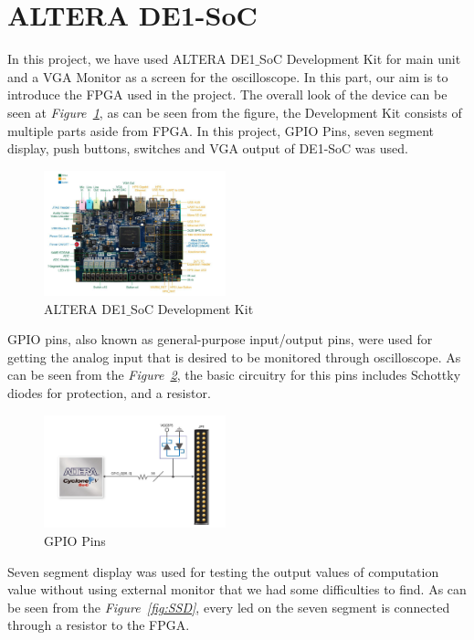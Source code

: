 \documentclass[paper]{IEEEtran}
\begin{document}
	
	\section{ALTERA DE1-SoC}
	\- \indent
	In this project, we have used ALTERA DE1$\_$SoC Development Kit for main unit and a VGA Monitor as a screen for the oscilloscope. In this part, our aim is to introduce the FPGA used in the project. The overall look of the device can be seen at \textit{Figure~\ref{fig:FPGA}}, as can be seen from the figure, the Development Kit consists of multiple parts aside from FPGA. In this project, GPIO Pins, seven segment display, push buttons, switches and VGA output of DE1-SoC was used.  
	
	\begin{figure}[H]
		\setlength{\unitlength}{\textwidth}
		\center 
		\includegraphics[width=0.47\textwidth]{FPGA}
		\caption{\label{fig:FPGA}ALTERA DE1$\_$SoC Development Kit}
	\end{figure}
	
	GPIO pins, also known as general-purpose input/output pins, were used for getting the analog input that is desired to be monitored through oscilloscope. As can be seen from the \textit{Figure~\ref{fig:GPIO}}, the basic circuitry for this pins includes Schottky diodes for protection, and a resistor.
	
	\begin{figure}[H]
		\setlength{\unitlength}{\textwidth}
		\center 
		\includegraphics[width=0.47\textwidth]{GPIOpins}
		\caption{\label{fig:GPIO}GPIO Pins}
	\end{figure}
	
	Seven segment display was used for testing the output values of computation value without using external monitor that we had some difficulties to find. As can be seen from the \textit{Figure~\ref{fig:SSD}}, every led on the seven segment is connected through a resistor to the FPGA.
	
\end{document}
